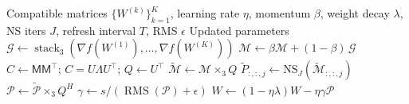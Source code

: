 \begin{algorithm}[H]
\caption{TUON (Tensor-Aware Optimization via T-SVD and Polarization)}
\label{alg:tuon}
\begin{algorithmic}[1]
\Require Compatible matrices $\{W^{(k)}\}_{k=1}^{K}$, learning rate $\eta$, momentum $\beta$, weight decay $\lambda$, NS iters $J$, refresh interval $T$, RMS $\epsilon$
\Ensure Updated parameters
    \State $\mathcal{G} \gets \operatorname{stack}_3(\nabla f(W^{(1)}), \ldots, \nabla f(W^{(K)}))$ 
    \State $\mathcal{M} \gets \beta \mathcal{M} + (1-\beta)\, \mathcal{G}$ 
    \State $C \gets \mathsf{M}\mathsf{M}^{\top}$; $C = U \Lambda U^{\top}$; $Q \gets U^{\top}$ 
    \State $\widetilde{\mathcal{M}} \gets \mathcal{M} \times_3 Q$ 
        \State $\widetilde{P}_{:, :, j} \gets \mathrm{NS}_J(\widetilde{\mathcal{M}}_{:, :, j})$ 
    \EndFor
    \State $\mathcal{P} \gets \widetilde{\mathcal{P}} \times_3 Q^{H}$ 
    \State $\gamma \gets s / (\operatorname{RMS}(\mathcal{P}) + \epsilon)$ 
    \State $W \gets (1-\eta\lambda) W - \eta \gamma \mathcal{P}$ 
\EndFor
\end{algorithmic}
\end{algorithm}

